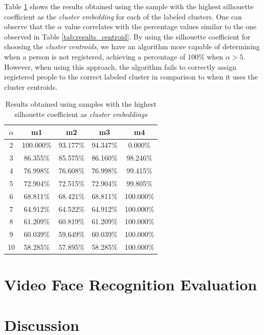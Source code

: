 Table \ref{tab:results_silhouette} shows the results obtained using the sample with the highest silhouette coefficient as the \emph{cluster embedding} for each of the labeled clusters.
One can observe that the $\alpha$ value correlates with the percentage values similar to the one observed in Table \ref{tab:results_centroid}.
By using the silhouette coefficient for choosing the \emph{cluster centroids}, we have an algorithm more capable of determining when a person is not registered, achieving a percentage of $100\%$ when $\alpha>5$.
However, when using this approach, the algorithm fails to correctly assign registered people to the correct labeled cluster in comparison to when it uses the cluster centroids.

\begin{table}[!ht]
\centering
\small
\caption{Results obtained using samples with the highest silhouette coefficient as \emph{cluster embeddings}}
\label{tab:results_silhouette}
\begin{tabular}{ccccc}
\hline
\textbf{$\alpha$} & \textbf{m1} & \textbf{m2} & \textbf{m3} & \textbf{m4} \\ \hline
2 & 100.000\% & 93.177\% & 94.347\% & 0.000\% \\
3 & 86.355\% & 85.575\% & 86.160\% & 98.246\% \\
4 & 76.998\% & 76.608\% & 76.998\% & 99.415\% \\
5 & 72.904\% & 72.515\% & 72.904\% & 99.805\% \\
6 & 68.811\% & 68.421\% & 68.811\% & 100.000\% \\
7 & 64.912\% & 64.522\% & 64.912\% & 100.000\% \\
8 & 61.209\% & 60.819\% & 61.209\% & 100.000\% \\
9 & 60.039\% & 59.649\% & 60.039\% & 100.000\% \\
10 & 58.285\% & 57.895\% & 58.285\% & 100.000\%
\end{tabular}
\end{table}

\section{Video Face Recognition Evaluation}
\label{sec:recognition_video_evaluation}

\section{Discussion}
\label{sec:recognition_discussion}
